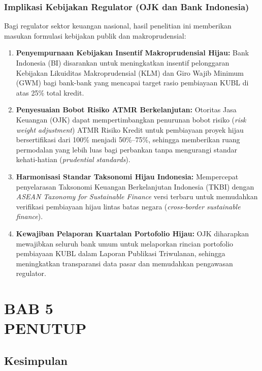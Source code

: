 \documentclass[12pt,a4paper]{article}
\numberwithin{equation}{section}
\begin{document}
\subsubsection{Implikasi Kebijakan Regulator (OJK dan Bank Indonesia)}
\noindent
Bagi regulator sektor keuangan nasional, hasil penelitian ini memberikan masukan formulasi kebijakan publik dan makroprudensial:
\begin{enumerate}
  \item \textbf{Penyempurnaan Kebijakan Insentif Makroprudensial Hijau:} Bank Indonesia (BI) disarankan untuk meningkatkan insentif pelonggaran Kebijakan Likuiditas Makroprudensial (KLM) dan Giro Wajib Minimum (GWM) bagi bank-bank yang mencapai target rasio pembiayaan KUBL di atas 25\% total kredit.
  \item \textbf{Penyesuaian Bobot Risiko ATMR Berkelanjutan:} Otoritas Jasa Keuangan (OJK) dapat mempertimbangkan penurunan bobot risiko (\emph{risk weight adjustment}) ATMR Risiko Kredit untuk pembiayaan proyek hijau bersertifikasi dari 100\% menjadi 50\%--75\%, sehingga memberikan ruang permodalan yang lebih luas bagi perbankan tanpa mengurangi standar kehati-hatian (\emph{prudential standards}).
  \item \textbf{Harmonisasi Standar Taksonomi Hijau Indonesia:} Mempercepat penyelarasan Taksonomi Keuangan Berkelanjutan Indonesia (TKBI) dengan \emph{ASEAN Taxonomy for Sustainable Finance} versi terbaru untuk memudahkan verifikasi pembiayaan hijau lintas batas negara (\emph{cross-border sustainable finance}).
  \item \textbf{Kewajiban Pelaporan Kuartalan Portofolio Hijau:} OJK diharapkan mewajibkan seluruh bank umum untuk melaporkan rincian portofolio pembiayaan KUBL dalam Laporan Publikasi Triwulanan, sehingga meningkatkan transparansi data pasar dan memudahkan pengawasan regulator.
\end{enumerate}

\newpage
\setcounter{section}{0}
\section*{BAB 5\\[0.3cm]PENUTUP}
\setcounter{section}{5}
\setcounter{subsection}{0}

\subsection{Kesimpulan}
\end{document}
